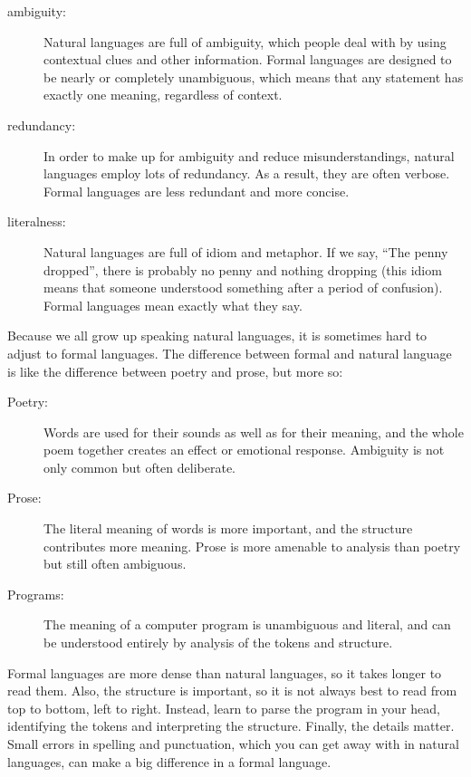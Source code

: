 \begin{description}

\item[ambiguity:] Natural languages are full of ambiguity, which
people deal with by using contextual clues and other information.
Formal languages are designed to be nearly or completely unambiguous,
which means that any statement has exactly one meaning,
regardless of context.

\item[redundancy:] In order to make up for ambiguity and reduce
misunderstandings, natural languages employ lots of redundancy. As a result,
they are often verbose. Formal languages are less redundant and more concise.

\item[literalness:] Natural languages are full of idiom and metaphor. If we
say, ``The penny dropped'', there is probably no penny and nothing dropping
(this idiom means that someone understood something after a period of
confusion). Formal languages mean exactly what they say.

\end{description}

Because we all grow up speaking natural languages, it is sometimes hard to
adjust to formal languages. The difference between formal and natural language
is like the difference between poetry and prose, but more so: 

\begin{description}

\item[Poetry:] Words are used for their sounds as well as for their meaning,
and the whole poem together creates an effect or emotional response. Ambiguity
is not only common but often deliberate.

\item[Prose:] The literal meaning of words is more important, and the
structure contributes more meaning. Prose is more amenable to analysis than
poetry but still often ambiguous.

\item[Programs:] The meaning of a computer program is unambiguous and literal,
and can be understood entirely by analysis of the tokens and structure.

\end{description}

Formal languages are more dense than natural languages, so it takes longer to
read them. Also, the structure is important, so it is not always best to read
from top to bottom, left to right. Instead, learn to parse the program in your
head, identifying the tokens and interpreting the structure. Finally, the
details matter. Small errors in spelling and punctuation, which you can get
away with in natural languages, can make a big difference in a formal
language.


